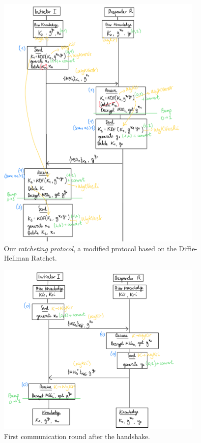 \begin{figure}
    \centering
    \includegraphics[width=0.9\textwidth]{figures/DH-ratchet-modified.png}
    \caption{Our \emph{ratcheting protocol}, a modified protocol based on the Diffie-Hellman Ratchet.}
    \label{fig:dh-ratchet-modified}
\end{figure}

\begin{figure}
    \centering
    \includegraphics[width=0.9\textwidth]{figures/DH-ratchet-modified-first.png}
    \caption{First communication round after the handshake.}
    \label{fig:dh-ratchet-modified-first}
\end{figure}

